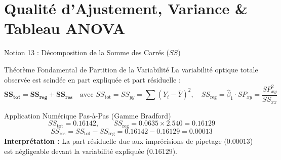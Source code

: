 \documentclass[aspectratio=169,10pt]{beamer}
\begin{document}
\section{Qualité d'Ajustement, Variance \& Tableau ANOVA}

\begin{frame}{Notion 13 : Décomposition de la Somme des Carrés ($SS$)}
  \begin{conceptbox}{Théorème Fondamental de Partition de la Variabilité}
    \footnotesize
    La variabilité optique totale observée est scindée en part expliquée et part résiduelle :
    \begin{equation*}
      \mathbf{SS_{\text{tot}} = SS_{\text{reg}} + SS_{\text{res}}} \quad \text{avec } 
      SS_{\text{tot}} = SS_{yy} = \sum (Y_i - \bar{Y})^2, \quad SS_{\text{reg}} = \hat{\beta}_1 \cdot SP_{xy} = \frac{SP_{xy}^2}{SS_{xx}}
    \end{equation*}
  \end{conceptbox}
  \vspace{1mm}
  \begin{biobox}{Application Numérique Pas-à-Pas (Gamme Bradford)}
    \footnotesize
    \begin{equation*}
      SS_{\text{tot}} = \mathbf{0.16142}, \qquad SS_{\text{reg}} = 0.0635 \times 2.540 = \mathbf{0.16129}
    \end{equation*}
    \begin{equation*}
      SS_{\text{res}} = SS_{\text{tot}} - SS_{\text{reg}} = 0.16142 - 0.16129 = \mathbf{0.00013}
    \end{equation*}
    \textbf{Interprétation :} La part résiduelle due aux imprécisions de pipetage ($0.00013$) est négligeable devant la variabilité expliquée ($0.16129$).
  \end{biobox}
\end{frame}
\end{document}

